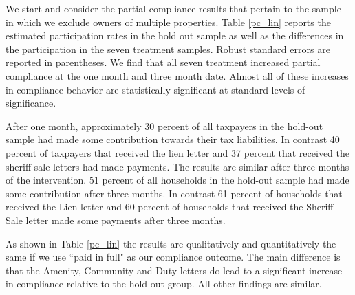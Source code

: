 \documentclass[12pt]{article}
\begin{document}
We start and consider the partial compliance results that pertain to
the sample in which we exclude owners of multiple properties.  Table
\ref{pc_lin} reports the estimated participation rates in the hold out
sample as well as the differences in the participation in the seven
treatment samples. Robust standard errors are reported in
parentheses. We find that all seven treatment increased partial
compliance at the one month and three month date. Almost all of these
increases in compliance behavior are statistically significant at
standard levels of significance.

After one month, approximately 30 percent of all taxpayers in the
hold-out sample had made some contribution towards their tax
liabilities. In contrast 40 percent of taxpayers that received the
lien letter and 37 percent that received the sheriff sale letters had
made payments. The results are similar after three months of the
intervention.  51 percent of all households in the hold-out sample had
made some contribution after three months. In contrast 61 percent of
households that received the Lien letter and 60 percent of households
that received the Sheriff Sale letter made some payments after three
months.

As shown in Table \ref{pc_lin} the results are qualitatively and
quantitatively the same if we use ``paid in full" as our compliance
outcome. The main difference is that the Amenity, Community and Duty
letters do lead to a significant increase in compliance relative to
the hold-out group. All other findings are similar.
\end{document}
